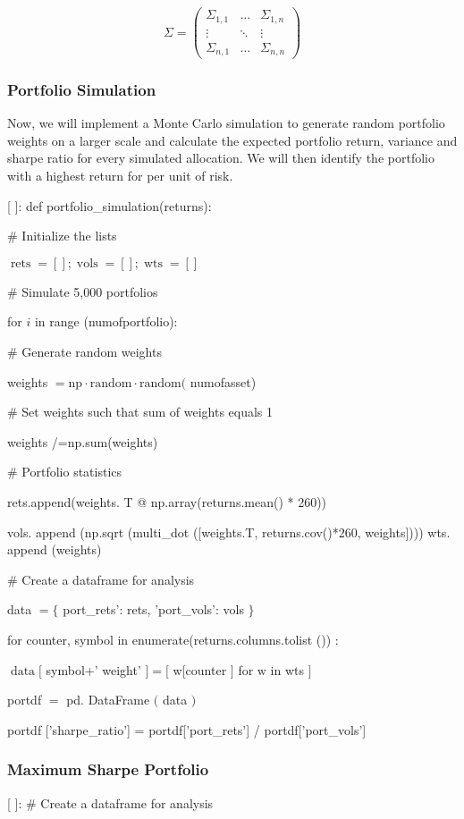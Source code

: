 \documentclass[10pt]{article}
\begin{document}
$$
\Sigma=\left(\begin{array}{ccc}
\Sigma_{1,1} & \ldots & \Sigma_{1, n} \\
\vdots & \ddots & \vdots \\
\Sigma_{n, 1} & \ldots & \Sigma_{n, n}
\end{array}\right)
$$

\subsubsection*{Portfolio Simulation}
Now, we will implement a Monte Carlo simulation to generate random portfolio weights on a larger scale and calculate the expected portfolio return, variance and sharpe ratio for every simulated allocation. We will then identify the portfolio with a highest return for per unit of risk.

[ ]: def portfolio\_simulation(returns):

\# Initialize the lists

$\operatorname{rets}=[] ; \operatorname{vols}=[] ; \operatorname{wts}=[]$

\# Simulate 5,000 portfolios

for $i$ in range (numofportfolio):

\# Generate random weights

weights $=\mathrm{np} \cdot \mathrm{random} \cdot \mathrm{random}($ numofasset)

\# Set weights such that sum of weights equals 1

weights /=np.sum(weights)

\# Portfolio statistics

rets.append(weights. T @ np.array(returns.mean() * 260))

vols. append (np.sqrt (multi\_dot ([weights.T, returns.cov()*260, weights]))) wts. append (weights)

\# Create a dataframe for analysis

data $=\{$ port\_rets': rets, 'port\_vols': vols $\}$

for counter, symbol in enumerate(returns.columns.tolist ()) :

$\operatorname{data}[$ symbol+' weight' $]=[$ w[counter $]$ for $\mathrm{w}$ in wts $]$

portdf $=$ pd. DataFrame $($ data $)$

portdf ['sharpe\_ratio'] = portdf['port\_rets'] / portdf['port\_vols']

\subsubsection*{Maximum Sharpe Portfolio}
[ ]: \# Create a dataframe for analysis
\end{document}
